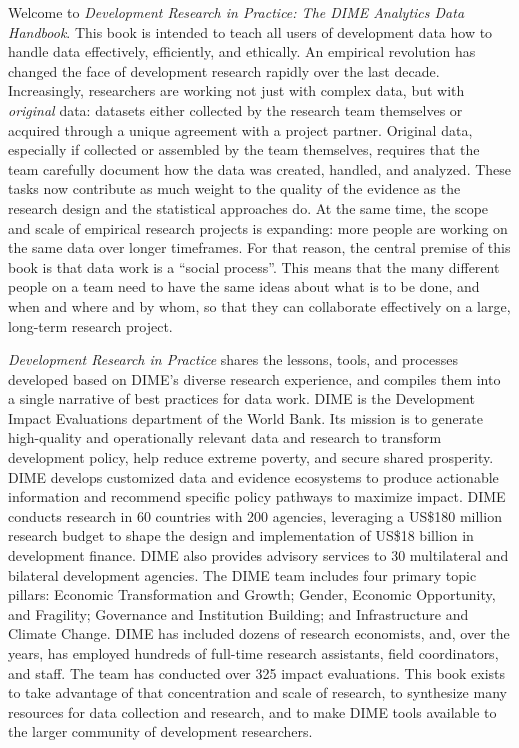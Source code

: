 \begin{fullwidth}
Welcome to \textit{Development Research in Practice: The DIME Analytics Data Handbook}.
This book is intended to teach all users of development data
how to handle data effectively, efficiently, and ethically.
An empirical revolution has changed the face of development research rapidly over the last decade.
Increasingly, researchers are working not just with complex data,
but with \textit{original} data:
datasets either collected by the research team themselves
or acquired through a unique agreement with a project partner.
Original data, especially if collected or assembled by the team themselves,
requires that the team carefully document how the data was created, handled, and analyzed.
These tasks now contribute as much weight to the quality of the evidence
as the research design and the statistical approaches do.
At the same time, the scope and scale of empirical research projects is expanding:
more people are working on the same data over longer timeframes.
For that reason, the central premise of this book is that data work is a ``social process''.
This means that the many different people on a team need to have the same ideas
about what is to be done, and when and where and by whom,
so that they can collaborate effectively on a large, long-term research project.

\textit{Development Research in Practice} shares the lessons, tools, 
and processes developed based on DIME's diverse research experience,
and compiles them into a single narrative of best practices for data work.
DIME is the Development Impact Evaluations department of the World Bank.
Its mission is to generate high-quality and operationally relevant data and research
to transform development policy, help reduce extreme poverty, and secure shared prosperity.
DIME develops customized data and evidence ecosystems to produce actionable information
and recommend specific policy pathways to maximize impact.
DIME conducts research in 60 countries with 200 agencies, leveraging a
US\$180 million research budget to shape the design and implementation of
US\$18 billion in development finance.
DIME also provides advisory services to 30 multilateral and bilateral development agencies.
The DIME team includes four primary topic pillars:
Economic Transformation and Growth;
Gender, Economic Opportunity, and Fragility;
Governance and Institution Building;
and Infrastructure and Climate Change.
DIME has included dozens of research economists,
and, over the years, has employed hundreds of full-time research assistants, field coordinators, and staff.
The team has conducted over 325 impact evaluations.
This book exists to take advantage of that concentration and scale of research,
to synthesize many resources for data collection and research,
and to make DIME tools available to the larger community of development researchers.


\end{fullwidth}
